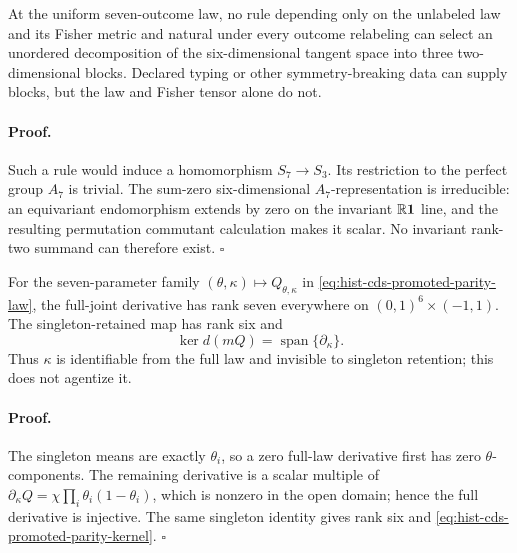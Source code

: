 At the uniform seven-outcome law, no rule depending only on the unlabeled law
and its Fisher metric and natural under every outcome relabeling can select
an unordered decomposition of the six-dimensional tangent space into three
two-dimensional blocks.  Declared typing or other symmetry-breaking data can
supply blocks, but the law and Fisher tensor alone do not.  

\paragraph{Proof.}
Such a rule would induce a homomorphism \(S_7\to S_3\).  Its restriction to
the perfect group \(A_7\) is trivial.  The sum-zero six-dimensional
\(A_7\)-representation is irreducible: an equivariant endomorphism extends by
zero on the invariant \(\mathbb R\mathbf1\) line, and the resulting permutation
commutant calculation makes it scalar.  No invariant rank-two summand can
therefore exist.  \(\square\)

For the seven-parameter family
\((\theta,\kappa)\mapsto Q_{\theta,\kappa}\) in
\eqref{eq:hist-cds-promoted-parity-law}, the full-joint derivative has rank
seven everywhere on \((0,1)^6\times(-1,1)\).  The singleton-retained map has
rank six and
\begin{equation}
\ker d(mQ)=\operatorname{span}\{\partial_\kappa\}.
\label{eq:hist-cds-promoted-parity-kernel}
\end{equation}
Thus \(\kappa\) is identifiable from the full law and invisible to singleton
retention; this does not agentize it.  

\paragraph{Proof.}
The singleton means are exactly \(\theta_i\), so a zero full-law derivative
first has zero \(\theta\)-components.  The remaining derivative is a scalar
multiple of \(\partial_\kappa Q=\chi\prod_i\theta_i(1-\theta_i)\), which is
nonzero in the open domain; hence the full derivative is injective.  The same
singleton identity gives rank six and
\eqref{eq:hist-cds-promoted-parity-kernel}.  \(\square\)

